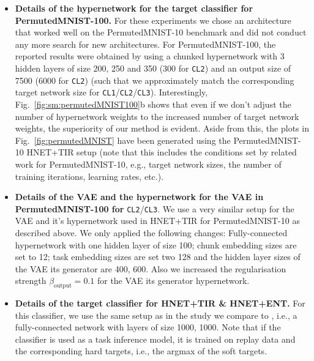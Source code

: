 \documentclass{article}
\begin{document}
\begin{itemize}
     \item \textbf{Details of the hypernetwork for the target classifier for PermutedMNIST-100.} 
      For these experiments we chose an architecture that worked well on the PermutedMNIST-10 benchmark and did not conduct any more search for new architectures.
      For PermutedMNIST-100, the reported results were obtained by using a chunked hypernetwork with 3 hidden layers of size 200, 250 and 350 (300 for \texttt{CL2}) and an output size of 7500 (6000 for \texttt{CL2}) (such that we approximately match the corresponding target network size for \texttt{CL1}/\texttt{CL2}/\texttt{CL3}). Interestingly, Fig.~\ref{fig:sm:permutedMNIST100}b shows that even if we don't adjust the number of hypernetwork weights to the increased number of target network weights, the superiority of our method is evident. Aside from this, the plots in Fig.~\ref{fig:permutedMNIST} have been generated using the PermutedMNIST-10 HNET+TIR setup (note that this includes the conditions set by related work for PermutedMNIST-10, e.g., target network sizes, the number of training iterations, learning rates, etc.).
      
\item \textbf{Details of the VAE and the hypernetwork for the VAE in PermutedMNIST-100 for } \texttt{CL2}/\texttt{CL3}.
    We use a very similar setup for the VAE and it's hypernetwork used in HNET+TIR for PermutedMNIST-10 as described above. We only applied the following changes: Fully-connected hypernetwork with one hidden layer of size 100; chunk embedding sizes are set to 12; task embedding sizes are set two 128 and the hidden layer sizes of the VAE its generator are 400, 600. Also we increased the regularisation strength $\beta_\text{output} = 0.1$ for the VAE its generator hypernetwork.
    
     \item \textbf{Details of the target classifier for HNET+TIR \& HNET+ENT.}
     For this classifier, we use the same setup as in the study we compare to \citep{van_de_ven_three_2019}, i.e., a fully-connected network with layers of size 1000, 1000.
     Note that if the classifier is used as a task inference model, it is trained on replay data and the corresponding hard targets, i.e., the argmax of the soft targets.
\end{itemize}
\end{document}
